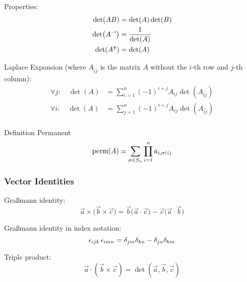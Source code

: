 			\noindent
			Properties:
			\begin{equation}
				\begin{aligned}
					\det(AB) &= \det(A)\det(B) \\
					\det(\inv{A}) &= \frac{1}{\det(A)} \\
					\det(A^\trp) &= \det(A) \\
				\end{aligned}
			\end{equation}

			\noindent
			Laplace Expansion (where $A_{\bar{i}\bar{j}}$ is the matrix $A$ without the $i$-th row and $j$-th column):
			\begin{equation}
				\begin{aligned}
					\forall j: \quad \det(A) &= \sum_{i=1}^n (-1)^{i+j}A_{ij} \det(A_{\bar{i}\bar{j}}) \\
					\forall i: \quad \det(A) &= \sum_{j=1}^n (-1)^{i+j}A_{ij} \det(A_{\bar{i}\bar{j}}) \\
				\end{aligned}
			\end{equation}

			\noindent
			Definition Permanent
			\begin{equation}
				\mathrm{perm}(A) = \sum_{\sigma\in S_n} \prod_{i=1}^n a_{i,\sigma(i)}
			\end{equation}

		\subsubsection{Vector Identities}
			\noindent
			Graßmann identity:
			\begin{equation}
				\vec{a}\times\big(\vec{b}\times\vec{c}\big) = \vec{b}\big(\vec{a}\cdot\vec{c}\big) - \vec{c}\big(\vec{a}\cdot\vec{b}\big)
			\end{equation}

			\noindent
			Graßmann identity in index notation:
			\begin{equation}
				\epsilon_{ijk}\,\epsilon_{imn}=\delta_{jm}\delta_{kn}-\delta_{jn}\delta_{km}
			\end{equation}

			\noindent
			Triple product:
			\begin{equation}
				\vec{a}\cdot\left(\vec{b}\times\vec{c}\right) = \det\left(\vec{a},\vec{b},\vec{c}\right)
			\end{equation}

